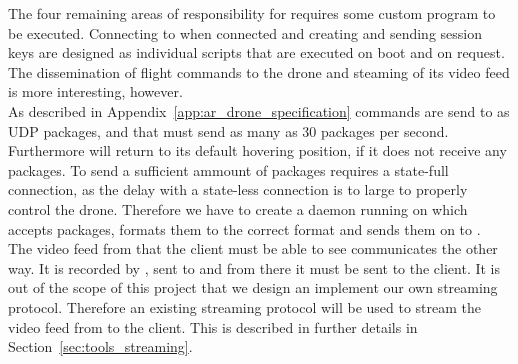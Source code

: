 The four remaining areas of responsibility for  requires some custom program to be executed.
Connecting to  when connected and creating and sending session keys are designed as individual scripts that are executed on boot and on request.
The dissemination of flight commands to the drone and steaming of its video feed is more interesting, however. \\

As described in Appendix~\ref{app:ar_drone_specification} commands are send to  as UDP packages, and that  must send as many as 30 packages per second.
Furthermore  will return to its default hovering position, if it does not receive any packages.
To send a sufficient ammount of packages requires a state-full connection, as the delay with a state-less connection is to large to properly control the drone.
Therefore we have to create a daemon running on  which accepts packages, formats them to the correct format and sends them on to .  \\

The video feed from  that the client must be able to see communicates the other way.
It is recorded by , sent to  and from there it must be sent to the client.
It is out of the scope of this project that we design an implement our own streaming protocol.
Therefore an existing streaming protocol will be used to stream the video feed from  to the client.
This is described in further details in Section~\ref{sec:tools_streaming}.





